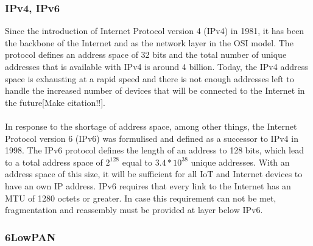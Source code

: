 \subsubsection{IPv4, IPv6}
Since the introduction of Internet Protocol version 4 (IPv4) in 1981\cite{rfc791}, it has been the backbone of the Internet and as the network layer in the OSI model. The protocol defines an address space of 32 bits and the total number of unique addresses that is available with IPv4 is around 4 billion. Today, the IPv4 address space is exhausting at a rapid speed and there is not enough addresses left to handle the increased number of devices that will be connected to the Internet in the future[Make citation!!].
\\\\
In response to the shortage of address space, among other things, the Internet Protocol version 6 (IPv6) was formulised and defined as a successor to IPv4 in 1998\cite{rfc2460}. The IPv6 protocol defines the length of an address to 128 bits, which lead to a total address space of ${2^{128}}$ equal to ${3.4*10^{38}}$ unique addresses. With an address space of this size, it will be sufficient for all IoT and Internet devices to have an own IP address. IPv6 requires that every link to the Internet has an MTU of 1280 octets or greater. In case this requirement can not be met,  fragmentation and reassembly must be provided at layer below IPv6\cite{rfc2460}.



\subsubsection{6LowPAN}

